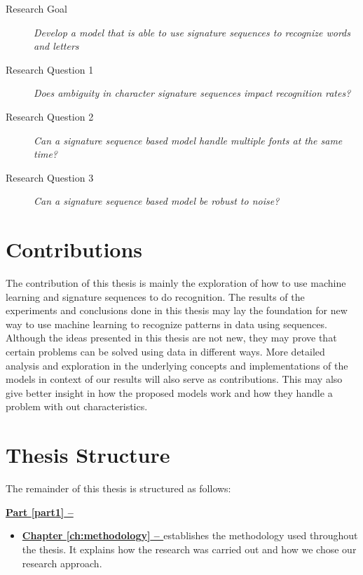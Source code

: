 \begin{description}
    \item[Research Goal]{\textit{Develop a model that is able to use signature sequences to recognize words and letters}}
    \item[Research Question 1]{\textit{Does ambiguity in character signature sequences impact recognition rates?}}
    \item[Research Question 2]{\textit{Can a signature sequence based model handle multiple fonts at the same time?}}
    \item[Research Question 3]{\textit{Can a signature sequence based model be robust to noise?}}
\end{description}


\section{Contributions}
\label{sec:contributions}
The contribution of this thesis is mainly the exploration of how to use machine learning and signature sequences to do recognition. The results of the experiments and conclusions done in this thesis may lay the foundation for new way to use machine learning to recognize patterns in data using sequences. Although the ideas presented in this thesis are not new, they may prove that certain problems can be solved using data in different ways. More detailed analysis and exploration in the underlying concepts and implementations of the models in context of our results will also serve as contributions. This may also give better insight in how the proposed models work and how they handle a problem with out characteristics.


\section{Thesis Structure}
The remainder of this thesis is structured as follows:

\vspace{0.5cm}\noindent
\begin{minipage}{\linewidth}
    \textbf{{\hyperref[part1]{Part \ref{part1} -- }}}
    \begin{itemize}
        \item\textbf{\hyperref[ch:methodology]{Chapter \ref{ch:methodology} -- }} establishes the methodology used throughout the thesis. It explains how the research was carried out and how we chose our research approach.
    \end{itemize}
\end{minipage}

